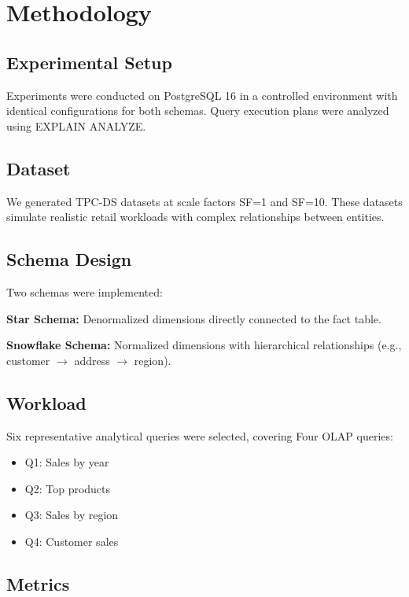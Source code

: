 \documentclass[conference]{IEEEtran}
\begin{document}
\section{Methodology}

\subsection{Experimental Setup}

Experiments were conducted on PostgreSQL 16 in a controlled environment with identical configurations for both schemas. Query execution plans were analyzed using EXPLAIN ANALYZE.

\subsection{Dataset}

We generated TPC-DS datasets at scale factors SF=1 and SF=10. These datasets simulate realistic retail workloads with complex relationships between entities.

\subsection{Schema Design}

Two schemas were implemented:

\textbf{Star Schema:}
Denormalized dimensions directly connected to the fact table.

\textbf{Snowflake Schema:}
Normalized dimensions with hierarchical relationships (e.g., customer $\rightarrow$ address $\rightarrow$ region).

\subsection{Workload}

Six representative analytical queries were selected, covering Four OLAP queries:
\begin{itemize}
\item Q1: Sales by year
\item Q2: Top products
\item Q3: Sales by region
\item Q4: Customer sales
\end{itemize}

\subsection{Metrics}
\end{document}
